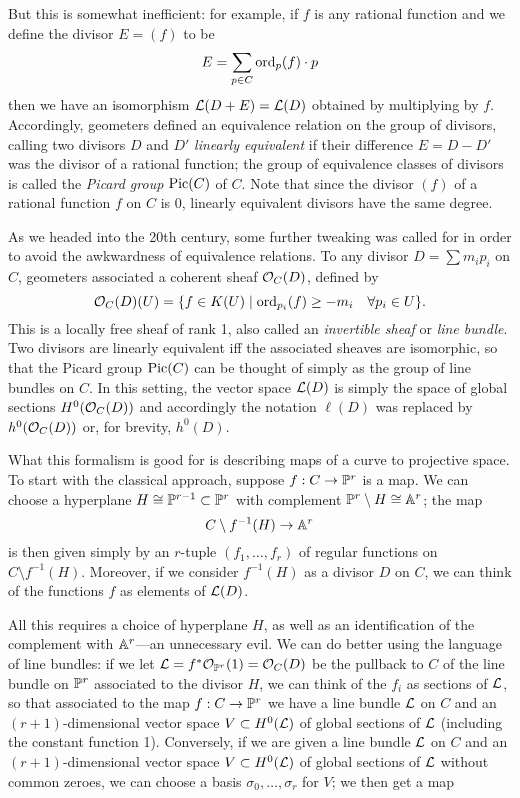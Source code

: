 But this is somewhat inefficient: for example, if $f$ is any rational function and we define the divisor $E = (f)$ to be
$$
E = \sum_{p\in C} \ord_p(f)\cdot p
$$
then we have an isomorphism $\cL(D+E) = \cL(D)$ obtained by multiplying by $f$. Accordingly, geometers defined an equivalence relation on the group of divisors, calling two divisors $D$ and $D'$ \emph{linearly equivalent} if their difference $E = D - D'$ was the divisor of a rational function; the group of equivalence classes of divisors is called the \emph{Picard group} $\Pic(C)$ of $C$. Note that since the divisor $(f)$ of a rational function $f$ on $C$ is 0, linearly equivalent divisors have the same degree.

As we headed into the 20th century, some further tweaking was called for in order to avoid the awkwardness of equivalence relations. To any divisor $D = \sum m_ip_i$ on $C$, geometers associated a coherent sheaf $\cO_C(D)$, defined by
$$
\cO_C(D)(U) = \{ f \in K(U) \mid \ord_{p_i}(f) \geq -m_i \quad \forall p_i \in U \}.
$$
This is a locally free sheaf of rank 1, also called an \emph{invertible sheaf} or \emph{line bundle}. Two divisors are linearly equivalent iff the associated sheaves are isomorphic, so that the Picard group $\Pic(C)$ can be thought of simply as the group of line bundles on $C$. In this setting, the vector space $\cL(D)$ is simply the space of global sections $H^0(\cO_C(D))$ and accordingly the notation $\ell(D)$ was replaced by $h^0(\cO_C(D))$ or, for brevity, $h^0(D)$. 

What this formalism is good for is describing maps of a curve to projective space. To start with the classical approach, suppose $f : C \to \PP^r$ is a map. We can choose a hyperplane $H \cong \PP^{r-1} \subset \PP^r$ with complement $\PP^r \setminus H \cong \AA^r$; the map 
$$
C \setminus f^{-1}(H) \to \AA^r
$$
is then given simply by an $r$-tuple $(f_1,\dots,f_r)$ of regular functions on $C \setminus f^{-1}(H)$. Moreover, if we consider $f^{-1}(H)$ as a divisor $D$ on $C$, we can think of the functions $f$ as elements of $\cL(D)$.

All this requires a choice of hyperplane $H$, as well as an identification of the complement with $\AA^r$---an unnecessary evil. We can do better using the language of line bundles: if we let $\cL = f^*\cO_{\PP^r}(1) = \cO_C(D)$ be the pullback to $C$ of the line bundle on $\PP^r$ associated to the divisor $H$, we can think of the $f_i$ as sections of $\cL$, so that associated to the map $f : C \to \PP^r$ we have a line bundle $\cL$ on $C$ and an $(r+1)$-dimensional vector space $V \subset H^0(\cL)$ of global sections of $\cL$ (including the constant function 1). Conversely, if we are given a line bundle $\cL$ on $C$ and an $(r+1)$-dimensional vector space $V \subset H^0(\cL)$ of global sections of $\cL$ without common zeroes, we can choose a basis $\sigma_0,\dots,\sigma_r$ for $V$; we then get a map 

